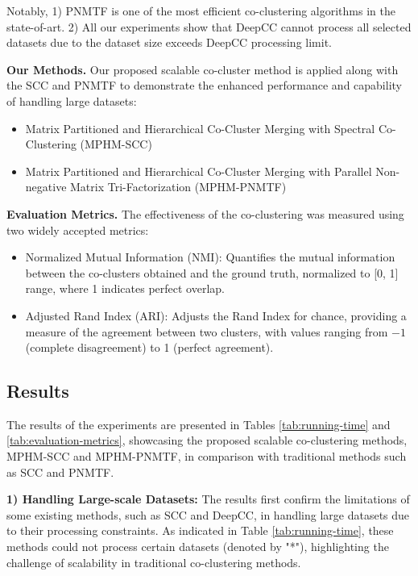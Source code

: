 Notably, 1) PNMTF is one of the most efficient co-clustering algorithms in the state-of-art. 2) All our experiments show that DeepCC cannot process all selected datasets due to the dataset size exceeds DeepCC processing limit.

\textbf{Our Methods.} Our proposed scalable co-cluster method is applied along with the SCC and PNMTF to demonstrate the enhanced performance and capability of handling large datasets:
\begin{itemize}
    \item Matrix Partitioned and Hierarchical Co-Cluster Merging with Spectral Co-Clustering (MPHM-SCC)
    \item Matrix Partitioned and Hierarchical Co-Cluster Merging with Parallel Non-negative Matrix Tri-Factorization (MPHM-PNMTF)
\end{itemize}

\textbf{Evaluation Metrics.}
The effectiveness of the co-clustering was measured using two widely accepted metrics:

\begin{itemize}
    \item Normalized Mutual Information (NMI): Quantifies the mutual information between the co-clusters obtained and the ground truth, normalized to [0, 1] range, where 1 indicates perfect overlap.
    \item Adjusted Rand Index (ARI): Adjusts the Rand Index for chance, providing a measure of the agreement between two clusters, with values ranging from $-1$ (complete disagreement) to 1 (perfect agreement).
\end{itemize}

\subsection{Results}
The results of the experiments are presented in Tables \ref{tab:running-time} and \ref{tab:evaluation-metrics}, showcasing the proposed scalable co-clustering methods, MPHM-SCC and MPHM-PNMTF, in comparison with traditional methods such as SCC and PNMTF.

\textbf{1) Handling Large-scale Datasets:} The results first confirm the limitations of some existing methods, such as SCC and DeepCC, in handling large datasets due to their processing constraints. As indicated in Table \ref{tab:running-time}, these methods could not process certain datasets (denoted by "*"), highlighting the challenge of scalability in traditional co-clustering methods.

